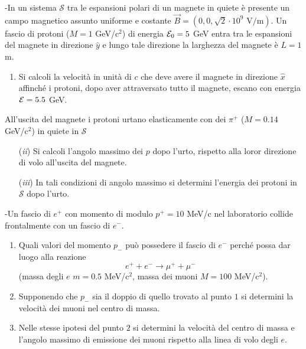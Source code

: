 \documentclass[12pt,twoside,a4]{article}
\begin{document}
\newpage
\begin{esercizio}[Esame 19/09/2015]
	-In un sistema $\mathcal{S}$ tra le espansioni polari di un magnete in quiete è presente un campo magnetico assunto uniforme e costante $\vec{B} = (0,0,\sqrt{2} \cdot 10^9 \mbox{ V/m})$. Un fascio di protoni ($M = 1 $ GeV/c$^2$) di energia $\mathcal{E}_0 = 5$ GeV entra tra le espansioni del magnete in direzione $\widehat{y}$ e lungo tale direzione la larghezza del magnete è $L = 1$ m. 
\begin{enumerate}[label=(\textit{\roman*})]
\item Si calcoli la velocità  in unità  di $c$ che deve avere il magnete in direzione $\widehat{x}$ affinché i protoni, dopo aver attraversato tutto il magnete, escano con energia $\mathcal{E} = 5.5$ GeV.
\end{enumerate}
\begin{flushleft} All'uscita del magnete i protoni urtano elasticamente con dei $\pi^+$ ($M = 0.14 $ GeV/c$^2$) in quiete in $\mathcal{S}$
\end{flushleft}
\begin{enumerate}[label=(\textit{\roman*})]
\item[(\textit{ii})] Si calcoli l'angolo massimo dei $p$ dopo l'urto, rispetto alla loror direzione di volo all'uscita del magnete.
\item[(\textit{iii})] In tali condizioni di angolo massimo si determini l'energia dei protoni in $\mathcal{S}$ dopo l'urto.
\end{enumerate}
\end{esercizio}


\begin{esercizio}[Esame 04/02/2014]
	-Un fascio di $e^+$ con momento di modulo $p^+ = 10$ MeV/c nel laboratorio collide frontalmente con un fascio di $e^-$.  
\begin{enumerate}[label=(\textit{\roman*})]
\item Quali valori del momento $p_-$ può possedere il fascio di $e^-$ perché possa dar luogo alla reazione 
$$ e^+ + e^- \longrightarrow \mu^+ + \mu^- $$
(massa degli $e$ $m=0.5$ MeV/c$^2$, massa dei muoni $M=100 $ MeV/c$^2$).
\item Supponendo che $p_-$ sia il doppio di quello trovato al punto $1$ si determini la velocità  dei muoni nel centro di massa.
\item Nelle stesse ipotesi del punto $2$ si determini la velocità  del centro di massa e l'angolo massimo di emissione dei muoni rispetto alla linea di volo degli $e$.
\end{enumerate}
\end{esercizio}
\end{document}
